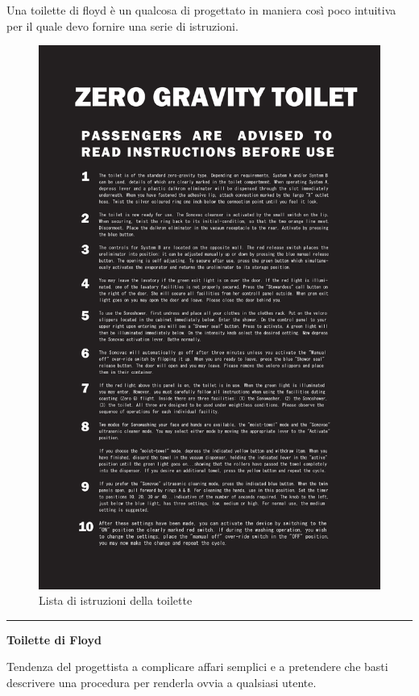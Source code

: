\documentclass[11pt,a4paper]{book}
\begin{document}
Una toilette di floyd è un qualcosa di progettato in maniera così poco intuitiva per il quale devo fornire una serie di istruzioni.
\begin{figure}[h!]
	\begin{center}
		\includegraphics[scale=0.08]{img/002.png}
		\caption{Lista di istruzioni della toilette}
		\label{fig: 002}
	\end{center}
\end{figure}

\noindent\rule{\textwidth}{1pt}
\begin{center}
	\textbf{Toilette di Floyd}
\end{center}

Tendenza del progettista a complicare affari semplici e a pretendere che basti descrivere una procedura per renderla ovvia a qualsiasi utente.
\end{document}
